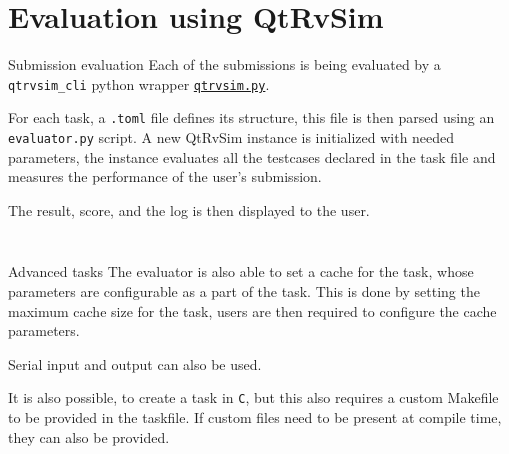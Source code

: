 \documentclass{beamer}
\begin{document}
		\section{Evaluation using QtRvSim}

		\begin{frame}{Submission evaluation}
			Each of the submissions is being evaluated by a \texttt{qtrvsim\_cli} python 
			wrapper \href{https://gitlab.fel.cvut.cz/b35apo/qtrvsim-eval-web/-/blob/main/evaluator/qtrvsim.py}{\texttt{qtrvsim.py}}. \par
	
			For each task, a \texttt{.toml} file defines its structure, this file is then parsed using an \texttt{evaluator.py} script. A new QtRvSim instance is initialized with needed parameters,
			the instance evaluates all the testcases declared in the task file and measures the performance of the user's submission. \par
	
			The result, score, and the log is then displayed to the user.
		\end{frame}
	
		\begin{frame}[fragile]
			\tiny
			\inputminted{python}{examples/5/evaluate.py}
		\end{frame}

		\begin{frame}[fragile]
			\tiny
			\inputminted{toml}{examples/5/task.toml}
		\end{frame}

		\begin{frame}{Advanced tasks}
			The evaluator is also able to set a cache for the task, whose parameters are configurable as a part of the task. This is done by setting the maximum cache size for the task, users are then required to configure the cache parameters. \par

			Serial input and output can also be used. \par

			It is also possible, to create a task in \texttt{C}, but this also requires a custom Makefile to be provided in the taskfile. If custom files need to be present at compile time, they can also be provided. \par
		\end{frame}

		\begin{frame}[fragile]
			\small
			\inputminted{toml}{examples/5/cache.toml}
		\end{frame}
\end{document}
